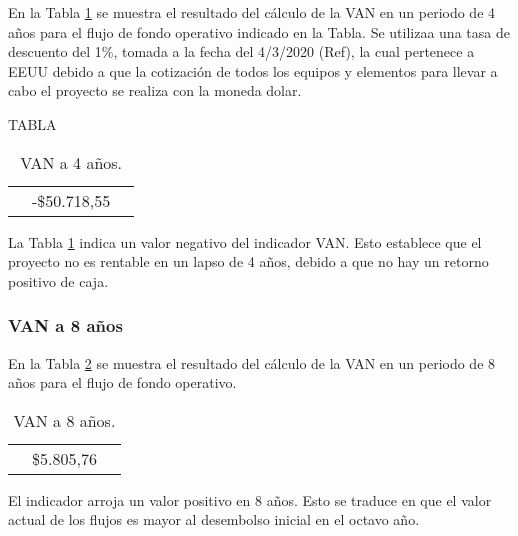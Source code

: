 En la Tabla \ref{tab:van-4} se muestra el resultado del cálculo de la VAN en un periodo de 4 años para el flujo de fondo operativo indicado en la Tabla. Se utilizaa una tasa de descuento del  1\%, tomada a la fecha del 4/3/2020 (Ref), la cual pertenece a EEUU debido a que la cotización de todos los equipos y elementos para llevar a cabo el proyecto se realiza con la moneda dolar.

TABLA
\begin{table}[H]
  \centering
    \begin{tabular}{|cc|r|}
    \rowcolor[rgb]{ .773,  .851,  .945} \multicolumn{3}{c}{\textbf{a 4 años}} \bigstrut[b]\\
    \hline
    \rowcolor[rgb]{ .773,  .851,  .945} \multicolumn{2}{|c|}{\textbf{VAN }} & \cellcolor[rgb]{ 1,  1,  1}\textcolor[rgb]{ 1,  0,  0}{-\$50.718,55} \bigstrut\\
    \hline
    \end{tabular}%
  \caption{VAN a 4 años.}  
  \label{tab:van-4}%
\end{table}%


La Tabla \ref{tab:van-4} indica un valor negativo del indicador VAN. Esto establece que el proyecto no es rentable en un lapso de 4 años, debido a que no hay un retorno positivo de caja. 

\subsubsection{VAN a 8 años}

En la Tabla \ref{tab:van-8} se muestra el resultado del cálculo de la VAN en un periodo de 8 años para el flujo de fondo operativo.

\begin{table}[H]
  \centering

    \begin{tabular}{|cc|r|}
    \rowcolor[rgb]{ .773,  .851,  .945} \multicolumn{3}{c}{\textbf{a 8 años}} \bigstrut[b]\\
    \hline
    \rowcolor[rgb]{ .773,  .851,  .945} \multicolumn{2}{|c|}{\textbf{VAN }} & \cellcolor[rgb]{ 1,  1,  1}\$5.805,76 \bigstrut\\
    \hline
    \end{tabular}%
  \caption{VAN a 8 años.}    
  \label{tab:van-8}%
\end{table}%


El indicador arroja un valor positivo en 8 años. Esto se traduce en que el valor actual de los flujos es mayor al desembolso inicial en el octavo año.

